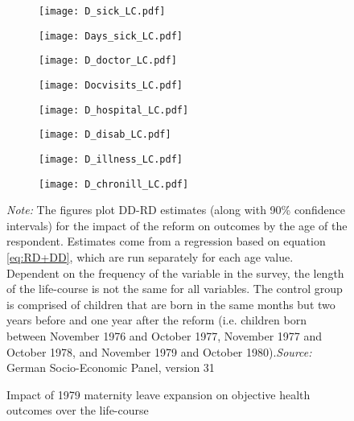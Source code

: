 \documentclass[a4paper ]{article}
\begin{document}
\begin{figure}[p]
\begin{subfigure}[h]{0.48\textwidth}\centering
	\texttt{[image: D\_sick\_LC.pdf]}
\end{subfigure}
\quad
\begin{subfigure}[h]{0.48\textwidth}\centering
	\texttt{[image: Days\_sick\_LC.pdf]}
\end{subfigure}

\begin{subfigure}[h]{0.48\textwidth}\centering
	\texttt{[image: D\_doctor\_LC.pdf]}
\end{subfigure}
\quad
\begin{subfigure}[h]{0.48\textwidth}\centering
	\texttt{[image: Docvisits\_LC.pdf]}
\end{subfigure}



\begin{subfigure}[h]{0.48\textwidth}\centering
	\texttt{[image: D\_hospital\_LC.pdf]}
\end{subfigure}
\quad
\begin{subfigure}[h]{0.48\textwidth}\centering
	\texttt{[image: D\_disab\_LC.pdf]}
\end{subfigure}

\begin{subfigure}[h]{0.48\textwidth}\centering
	\texttt{[image: D\_illness\_LC.pdf]}
\end{subfigure}
\quad
\begin{subfigure}[h]{0.48\textwidth}\centering
	\texttt{[image: D\_chronill\_LC.pdf]}
\end{subfigure}

\caption{Impact of 1979 maternity leave expansion on objective health outcomes over the life-course}\label{fig: LC_OH}
\begin{minipage}{\textwidth} %
{\footnotesize \textit{Note:} The figures plot DD-RD estimates (along with 90\% confidence intervals) for the impact of the reform on outcomes by the age of the respondent. Estimates come from a regression based on equation \ref{eq:RD+DD}, which are run separately for each age value. Dependent on the frequency of the variable in the survey, the length of the life-course is not the same for all variables. The control group is comprised of children that are born in the same months but two years before and one year after the reform (i.e. children born between November 1976 and October 1977, November 1977 and October 1978, and November 1979 and October 1980).\newline \textit{Source: }German Socio-Economic Panel, version 31\par}
\end{minipage}
\end{figure}
\end{document}
